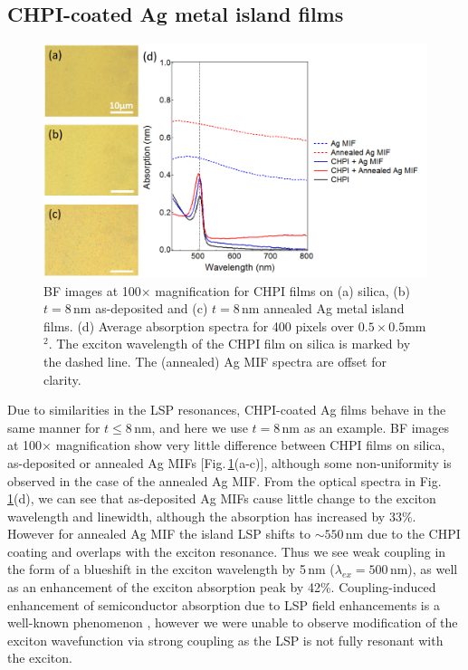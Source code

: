 \subsection{CHPI-coated Ag metal island films}
\label{sec:CHPI_AgMIF}
\begin{figure}[h!] 
\centering    
\includegraphics[width=\textwidth]{Fig7}
\caption{BF images at 100$\times$ magnification for CHPI films on (a) silica, (b) $t=8$\,nm as-deposited and (c) $t=8$\,nm annealed Ag metal island films. (d) Average absorption spectra for 400 pixels over $0.5\times0.5$mm$^2$. The exciton wavelength of the CHPI film on silica is marked by the dashed line. The (annealed) Ag MIF spectra are offset for clarity.}
\label{6Fig7}
\end{figure}
Due to similarities in the LSP resonances, CHPI-coated Ag films behave in the same manner for $t\leq8$\,nm, and here we use $t=8$\,nm as an example. %
BF images at 100$\times$ magnification show very little difference between CHPI films on silica, as-deposited or annealed Ag MIFs [Fig.\,\ref{6Fig7}(a-c)], although some non-uniformity is observed in the case of the annealed Ag MIF. From the optical spectra in Fig.\,\ref{6Fig7}(d), we can see that as-deposited Ag MIFs cause little change to the exciton wavelength and linewidth, although the absorption has increased by 33\%. However for annealed Ag MIF the island LSP shifts to $\sim550$\,nm due to the CHPI coating and overlaps with the exciton resonance. Thus we see weak coupling in the form of a blueshift in the exciton wavelength by 5\,nm  ($\lambda_{ex}=500$\,nm), as well as an enhancement of the exciton absorption peak by 42\%. Coupling-induced enhancement of semiconductor absorption due to LSP field enhancements is a well-known phenomenon \cite{Balci2014, Alemu2014, Zheng2011, Xu2013, Spinelli2012}, however we were unable to observe modification of the exciton wavefunction via strong coupling as the LSP is not fully resonant with the exciton.

